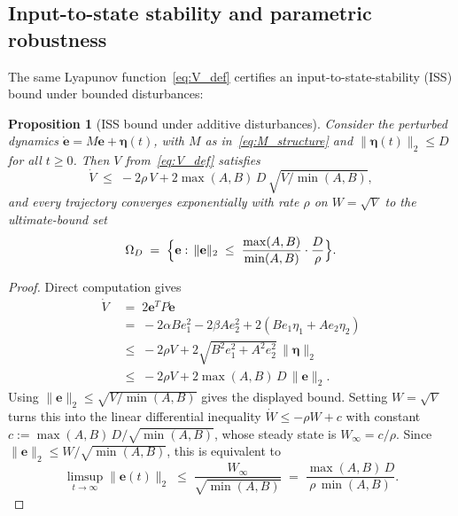 \documentclass[12pt]{article}
\newtheorem{proposition}{Proposition}
\begin{document}
\subsection{Input-to-state stability and parametric robustness}
\label{sec:lyap_iss}

The same Lyapunov function~\eqref{eq:V_def} certifies an
input-to-state-stability (ISS) bound under bounded disturbances:

\begin{proposition}[ISS bound under additive disturbances]
\label{prop:iss}
Consider the perturbed dynamics $\dot{\mathbf{e}} = M\mathbf{e} + \boldsymbol{\eta}(t)$,
with $M$ as in~\eqref{eq:M_structure} and $\|\boldsymbol{\eta}(t)\|_2\leq D$ for
all $t\geq 0$. Then $V$ from~\eqref{eq:V_def} satisfies
\begin{equation}
\dot{V} \;\leq\; -2\rho\,V + 2\max(A,B)\,D\,\sqrt{V/\min(A,B)},
\end{equation}
and every trajectory converges \emph{exponentially with rate $\rho$ on
$W=\sqrt{V}$} to the ultimate-bound set
\begin{equation}
\Omega_D \;=\; \Bigl\{\mathbf{e}:\, \|\mathbf{e}\|_2 \;\leq\; \frac{\max(A,B)}{\min(A,B)}\cdot\frac{D}{\rho}\Bigr\}.
\label{eq:iss_bound}
\end{equation}
\end{proposition}

\begin{proof}
Direct computation gives
\begin{align*}
\dot{V} \;&=\; 2\mathbf{e}^T P \dot{\mathbf{e}}\\
       \;&=\; -2\alpha B e_1^2 - 2\beta A e_2^2 + 2(B e_1 \eta_1 + A e_2 \eta_2)\\
       \;&\leq\; -2\rho V + 2\sqrt{B^2 e_1^2 + A^2 e_2^2}\,\|\boldsymbol{\eta}\|_2\\
       \;&\leq\; -2\rho V + 2\max(A,B)\,D\,\|\mathbf{e}\|_2.
\end{align*}
Using $\|\mathbf{e}\|_2 \leq \sqrt{V/\min(A,B)}$ gives the displayed bound.
Setting $W = \sqrt{V}$ turns this into the linear differential inequality
$\dot{W} \leq -\rho W + c$ with constant
$c:=\max(A,B)\,D/\sqrt{\min(A,B)}$, whose steady state is $W_\infty=c/\rho$.
Since $\|\mathbf{e}\|_2\le W/\sqrt{\min(A,B)}$, this is equivalent to
\[
\limsup_{t\to\infty}\|\mathbf{e}(t)\|_2 \;\leq\;
\frac{W_\infty}{\sqrt{\min(A,B)}}
\;=\; \frac{\max(A,B)\,D}{\rho\,\min(A,B)}.
\]
\end{proof}
\end{document}

